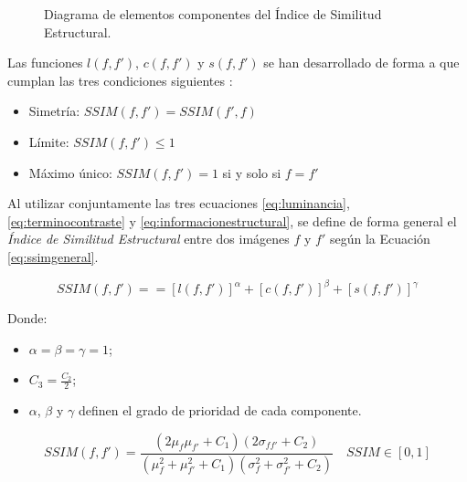 \begin{figure} [H]
\centering
{}

\caption{Diagrama de elementos componentes del Índice de Similitud Estructural.}
\label{fig:ssim_elementos}
\end{figure}

Las funciones $l(f,f')$, $c(f,f')$ y $s(f,f')$ se han desarrollado de forma a que cumplan las tres condiciones siguientes \cite{wang2004}:

\begin{itemize}
\item Simetría: $SSIM(f,f')=SSIM(f',f)$ 
\item Límite: $SSIM(f,f') \leqslant  1$ 
\item Máximo único: $SSIM(f,f')=1$ si y solo si $f=f'$
\end{itemize}

Al utilizar conjuntamente las tres ecuaciones \ref{eq:luminancia}, \ref{eq:terminocontraste} y \ref{eq:informacionestructural}, se define de forma general el \textit{Índice de Similitud Estructural} entre dos imágenes $f$ y $f'$ según la Ecuación \ref{eq:ssimgeneral}.

\begin{equation}
SSIM(f,f')==[l(f,f')]^\alpha+[c(f,f')]^\beta+[s(f,f')]^\gamma
\label{eq:ssimgeneral}
\end{equation}

Donde:
\begin{itemize}
\item $\alpha=\beta=\gamma=1$;
\item $C_3=\frac{C_2}{2}$; 
\item $\alpha$, $\beta$ y $\gamma$ definen el grado de prioridad de cada componente.
\end{itemize}

\begin{equation}\label{eq:ssim}
    SSIM(f,f')=\frac{(2\mu_f\mu_{f'}+C_1)(2\sigma_{ff'}+C_2)}{(\mu_f^2+\mu_{f'}^2+C_1)(\sigma_f^2+\sigma_{f'}^2+C_2)} \quad SSIM \in [0,1]
\end{equation}

